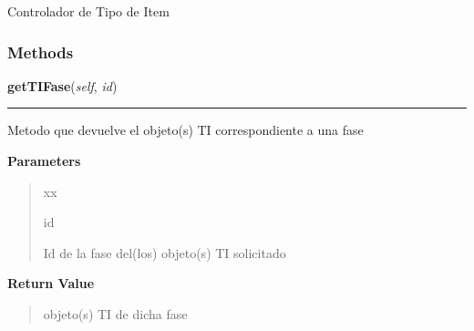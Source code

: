     \label{app:controlador:contItem:ControllerTI}
Controlador de Tipo de Item



  \subsubsection{Methods}

    \label{app:controlador:contItem:ControllerTI:getTIFase}

    \vspace{0.5ex}

\hspace{.8\funcindent}\begin{boxedminipage}{\funcwidth}

    \raggedright \textbf{getTIFase}(\textit{self}, \textit{id})

    \vspace{-1.5ex}

    \rule{\textwidth}{0.5\fboxrule}
\setlength{\parskip}{2ex}
    Metodo que devuelve el objeto(s) TI correspondiente a una fase

\setlength{\parskip}{1ex}
      \textbf{Parameters}
      \vspace{-1ex}

      \begin{quote}
        \begin{Ventry}{xx}

          \item[id]

          Id de la fase del(los) objeto(s) TI solicitado

        \end{Ventry}

      \end{quote}

      \textbf{Return Value}
    \vspace{-1ex}

      \begin{quote}
      objeto(s) TI de dicha fase

      \end{quote}

    \end{boxedminipage}

